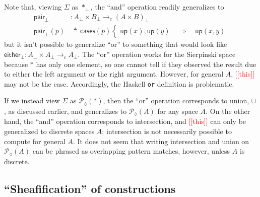\documentclass[conference]{IEEEtran}
\newcommand{\PLower}{\mathcal{P}_\lozenge}
\newcommand{\cto}{\to_c}
\newcommand{\One}{\ast}
\newcommand{\Branch}{\Rightarrow}
\newcommand{\note}[1]{\textcolor{red}{[[{#1}]]}}
\newcommand{\up}{\mathsf{up}}
\begin{document}
Note that, viewing $\Sigma$ as $\One_\bot$, the ``and'' operation readily generalizes to 
\begin{align*}
 \mathsf{pair}_\bot &: A_\bot \times B_\bot \cto \left( A \times B \right)_\bot
\\ \mathsf{pair}_\bot(p) &\triangleq \mathsf{cases}(p)
\begin{cases}
\up(x) , \up(y)
  \quad \Branch \quad \up(x, y)
\end{cases}
\end{align*}
but it isn't possible to generalize ``or'' to something that would look like $ \mathsf{either}_\bot: A_\bot \times A_\bot \cto A_\bot$. The ``or'' operation works for the Sierp\'inski space because $\One$ has only one element, so one cannot tell if they observed the result due to either the left argument or the right argument. However, for general $A$, \note{this} may not be the case. Accordingly, the Haskell \texttt{or} definition is problematic.

If we instead view $\Sigma$ as $\PLower(\One)$, then the ``or'' operation corresponds to union, $\cup$, as discussed earlier, and generalizes to $\PLower(A)$ for any space $A$. On the other hand, the ``and'' operation corresponds to intersection, and \note{this} can only be generalized to discrete spaces $A$; intersection is not necessarily possible to compute for general $A$. It does not seem that writing intersection and union on $\PLower(A)$ can be phrased as overlapping pattern matches, however, unless $A$ is discrete.

\subsection{``Sheafification'' of constructions}
\end{document}
